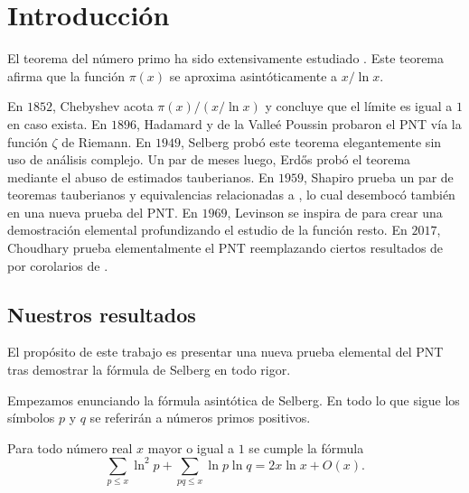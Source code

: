 \setlength{\headheight}{14.61858pt}
\pagestyle{fancy}

\chapter[Introducci\'on]
{Introducci\'on}
\label{ch:introduction}

\vspace*{1cm}

El teorema del n\'umero primo ha sido extensivamente estudiado
\cite{
  Breusch1960,
  Choudhary2017,
  Diamond1982,
  Erdos1949,
  Levinson1969,
  Liu2022,
  Newman1980,
  Pan2023,
  Richter2021,
  Selberg1949,
  Shapiro1959}.
Este teorema afirma que la funci\'on \(\pi(x)\) se aproxima
asint\'oticamente a \(x / \ln x\).

En \(1852\), Chebyshev \cite{Chebyshev1852} acota \(\pi(x) / (x / \ln x)\)
y concluye que el l\'imite es igual a \(1\) en caso exista.
En \(1896\), Hadamard \cite{Hadamard1896} y de la Valle\'e Poussin
probaron el PNT v\'ia la funci\'on \(\zeta\) de Riemann.
En \(1949\), Selberg \cite{Selberg1949}
prob\'o este teorema elegantemente sin uso de an\'alisis complejo.
Un par de meses luego, Erdős \cite{Erdos1949}
prob\'o el teorema mediante el abuso de estimados tauberianos.
En \(1959\), Shapiro \cite{Shapiro1959}
prueba un par de teoremas tauberianos y equivalencias relacionadas a \cite{Erdos1949},
lo cual desemboc\'o tambi\'en en una nueva prueba del PNT.
En \(1969\), Levinson \cite{Levinson1969} se inspira de \cite{Selberg1949, Breusch1960}
para crear una demostraci\'on elemental
profundizando el estudio de la funci\'on resto.
En \(2017\), Choudhary \cite{Choudhary2017} prueba elementalmente el PNT
reemplazando ciertos resultados de \cite{Levinson1969}
por corolarios de \cite{Shapiro1959}.

\section{Nuestros resultados}

El prop\'osito de este trabajo es presentar una nueva prueba elemental del PNT
tras demostrar la f\'ormula de Selberg en todo rigor.

\bigskip

Empezamos enunciando la f\'ormula asint\'otica de Selberg. 
En todo lo que sigue los s\'imbolos \(p\) y \(q\) se referir\'an a
n\'umeros primos positivos.

\begin{theorem}
  Para todo n\'umero real \(x\) mayor o igual a \(1\)
  se cumple la f\'ormula
  \[
    \sum_{p \leq x} \ln^2 p + \sum_{pq \leq x} \ln p \ln q = 2x\ln x + O(x).
  \]
\end{theorem}

